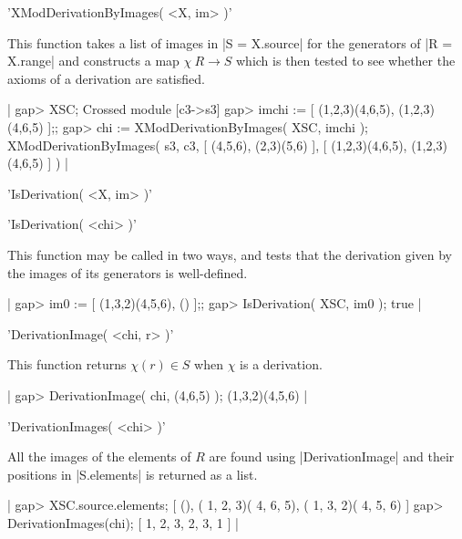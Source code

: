 %

'XModDerivationByImages( <X, im> )'

This function takes a list of images in |S = X.source|  for the generators
of |R = X.range| and constructs a map  $\chi \: R \to S$  which is then
tested to see whether the axioms of a derivation are satisfied.

|    gap> XSC;
    Crossed module [c3->s3]
    gap> imchi := [ (1,2,3)(4,6,5), (1,2,3)(4,6,5) ];;
    gap> chi := XModDerivationByImages( XSC, imchi );
    XModDerivationByImages( s3, c3, [ (4,5,6), (2,3)(5,6) ], 
       [ (1,2,3)(4,6,5), (1,2,3)(4,6,5) ] )  |

%

'IsDerivation( <X, im> )'

'IsDerivation( <chi> )'

This function may be called in two ways, and tests that the derivation
given by the images of its generators is well-defined.

|    gap> im0 := [ (1,3,2)(4,5,6), () ];;
    gap> IsDerivation( XSC, im0 );
    true  |

%

'DerivationImage( <chi, r> )'

This function returns $\chi(r) \in S$ when $\chi$ is a derivation.

|    gap> DerivationImage( chi, (4,6,5) );
    (1,3,2)(4,5,6)  |

%

'DerivationImages( <chi> )'

All the images of the elements of $R$ are found using |DerivationImage|
and their positions in |S.elements| is returned as a list.

|    gap> XSC.source.elements;
    [ (), ( 1, 2, 3)( 4, 6, 5), ( 1, 3, 2)( 4, 5, 6) ]
    gap> DerivationImages(chi);
    [ 1, 2, 3, 2, 3, 1 ]  |

%

